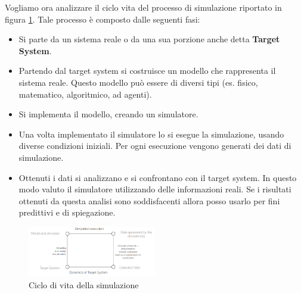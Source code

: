 Vogliamo ora analizzare il ciclo vita del processo di simulazione riportato in
figura \ref{fig:ciclo_simulazione}. Tale processo è composto dalle seguenti fasi:
\begin{itemize}
      \item Si parte da un sistema reale o da una sua porzione anche detta
            \textbf{Target System}.
      \item Partendo dal target system si costruisce un modello che rappresenta
            il sistema reale. Questo modello può essere di diversi tipi (es.
            fisico, matematico, algoritmico, ad agenti).
      \item Si implementa il modello, creando un simulatore.
      \item Una volta implementato il simulatore lo si esegue la simulazione,
            usando diverse condizioni iniziali. Per ogni esecuzione vengono
            generati dei dati di simulazione.
      \item Ottenuti i dati si analizzano e si confrontano con il target system.
            In questo modo valuto il simulatore utilizzando delle informazioni
            reali. Se i risultati ottenuti da questa analisi sono soddisfacenti
            allora posso usarlo per fini predittivi e di spiegazione.
\end{itemize}
\begin{figure}[!ht]
      \centering
      \includegraphics[width=0.5\textwidth]{./img/sim/ciclobase.png}
      \caption{Ciclo di vita della simulazione}
      \label{fig:ciclo_simulazione}
\end{figure}

